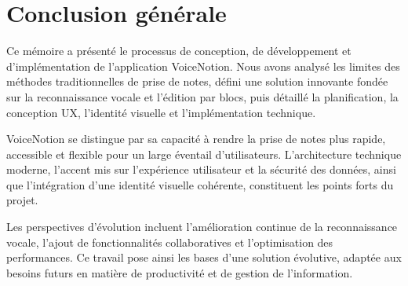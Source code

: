 \chapter*{Conclusion générale}
Ce mémoire a présenté le processus de conception, de développement et d’implémentation de l’application VoiceNotion. Nous avons analysé les limites des méthodes traditionnelles de prise de notes, défini une solution innovante fondée sur la reconnaissance vocale et l’édition par blocs, puis détaillé la planification, la conception UX, l’identité visuelle et l’implémentation technique.

VoiceNotion se distingue par sa capacité à rendre la prise de notes plus rapide, accessible et flexible pour un large éventail d’utilisateurs. L’architecture technique moderne, l’accent mis sur l’expérience utilisateur et la sécurité des données, ainsi que l’intégration d’une identité visuelle cohérente, constituent les points forts du projet.

Les perspectives d’évolution incluent l’amélioration continue de la reconnaissance vocale, l’ajout de fonctionnalités collaboratives et l’optimisation des performances. Ce travail pose ainsi les bases d’une solution évolutive, adaptée aux besoins futurs en matière de productivité et de gestion de l’information.
